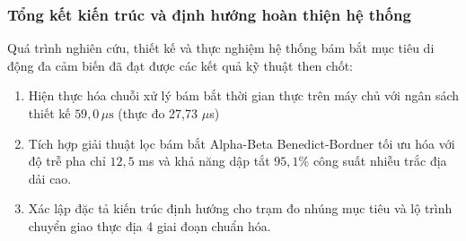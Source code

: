 \subsubsection{Tổng kết kiến trúc và định hướng hoàn thiện hệ thống}

\hspace{0.5cm} Quá trình nghiên cứu, thiết kế và thực nghiệm hệ thống bám bắt mục tiêu di động đa cảm biến đã đạt được các kết quả kỹ thuật then chốt:
\begin{enumerate}
    \item Hiện thực hóa chuỗi xử lý bám bắt thời gian thực trên máy chủ với ngân sách thiết kế $59{,}0\,\mu\text{s}$ (thực đo 27,73 $\mu$s)
    \item Tích hợp giải thuật lọc bám bắt Alpha-Beta Benedict-Bordner tối ưu hóa với độ trễ pha chỉ $12{,}5$ ms và khả năng dập tắt $95{,}1\%$ công suất nhiễu trắc địa dải cao.
    \item Xác lập đặc tả kiến trúc định hướng cho trạm đo nhúng mục tiêu và lộ trình chuyển giao thực địa 4 giai đoạn chuẩn hóa.
\end{enumerate}
